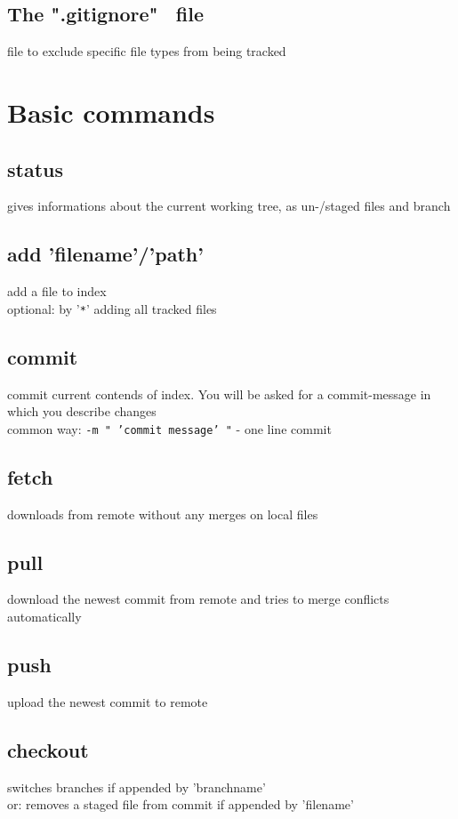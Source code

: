 \subsection*{The ".gitignore" \ file}
file to exclude specific file types from being tracked\\

\section*{Basic commands}

\subsection*{status}
gives informations about the current working tree, as un-/staged files and branch

\subsection*{add 'filename'/'path'}
add a file to index\\
optional: by '\texttt{*}' adding all tracked files

\subsection*{commit}
commit current contends of index. You will be asked for a commit-message in which you describe changes\\
common way: \texttt{-m "\ 'commit message' "} - one line commit

\subsection*{fetch}
downloads from remote without any merges on local files

\subsection*{pull}
download the newest commit from remote and tries to merge conflicts automatically 

\subsection*{push}
upload the newest commit to remote

\subsection*{checkout}
switches branches if appended by 'branchname'\\
or: removes a staged file from commit if appended by 'filename'

